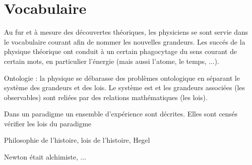 \section{Vocabulaire}

Au fur et à mesure des découvertes théoriques, les physiciens se sont servie dans le vocabulaire courant afin de nommer les nouvelles grandeurs. Les succés de la physique théorique ont conduit à un certain phagocytage du sens courant de certain mots, en particulier l'énergie (mais aussi l'atome, le temps, ...).

Ontologie : la physique se débarasse des problèmes ontologique en séparant le système des grandeurs et des lois. Le système est et les grandeurs associées (les observables) sont reliées par des relations mathématiques (les lois).

Dans un paradigme un ensemble d'expérience sont décrites. Elles sont censés vérifier les lois du paradigme

Philosophie de l'histoire, lois de l'histoire, Hegel


Newton était alchimiste, ...
